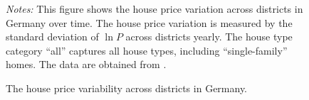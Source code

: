 \documentclass[
  12pt,
]{article}
\begin{document}
\begin{figure}


\caption{\label{fig-price-variation}The house price variability across
districts in Germany.}
\begin{minipage}{0.975\textwidth}
\small
\emph{Notes:} This
figure shows the house price variation across districts in Germany over
time. The house price variation is measured by the standard deviation of
\(\ln P\) across districts yearly. The house type category ``all''
captures all house types, including ``single-family'' homes. The data
are obtained from
\citet{rwi_redhk_2020}.
\end{minipage}


\end{figure}%
\end{document}
